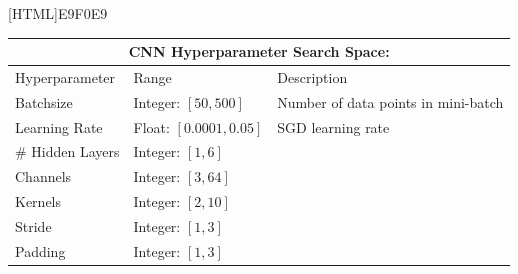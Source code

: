 \documentclass[colorinlistoftodos]{article}
\theoremstyle{definition}
\begin{document}
[HTML]{E9F0E9}{\parbox{\textwidth}{%
\small{
\begin{center}
\begin{tabular}{ |p{3cm}||p{3cm}|p{6cm}| }
 \hline
 \multicolumn{3}{|c|}{\textbf{CNN Hyperparameter Search Space:}} \\
 \hline
Hyperparameter & Range & Description\\
 \hline
 Batchsize & Integer: $[50, 500]$ & Number of data points in mini-batch\\
 Learning Rate & Float: $[0.0001, 0.05]$ & SGD learning rate\\
 \# Hidden Layers & Integer: $[1, 6]$ & \\ 
 Channels & Integer: $[3, 64]$ & \\
 Kernels & Integer: $[2, 10]$ & \\
 Stride & Integer: $[1, 3]$ & \\
 Padding & Integer: $[1, 3]$ & \\
 \hline
\end{tabular}	
\end{center}
}}}
\end{document}
